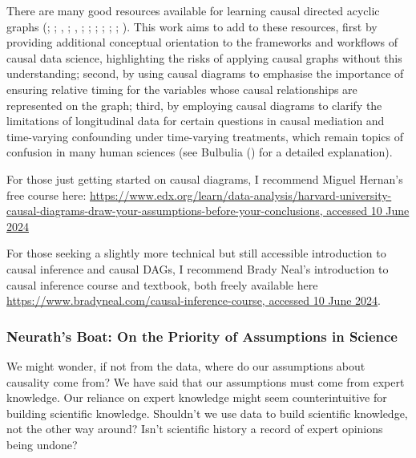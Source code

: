 \documentclass[
  single column]{article}
\begin{document}
There are many good resources available for learning causal directed
acyclic graphs (;
;
,
; , ;
;
;
;
; ; ). This work
aims to add to these resources, first by providing additional conceptual
orientation to the frameworks and workflows of causal data science,
highlighting the risks of applying causal graphs without this
understanding; second, by using causal diagrams to emphasise the
importance of ensuring relative timing for the variables whose causal
relationships are represented on the graph; third, by employing causal
diagrams to clarify the limitations of longitudinal data for certain
questions in causal mediation and time-varying confounding under
time-varying treatments, which remain topics of confusion in many human
sciences (see Bulbulia () for
a detailed explanation).

For those just getting started on causal diagrams, I recommend Miguel
Hernan's free course here:
\href{https://www.edx.org/learn/data-analysis/harvard-university-causal-diagrams-draw-your-assumptions-before-your-conclusions}{https://www.edx.org/learn/data-analysis/harvard-university-causal-diagrams-draw-your-assumptions-before-your-conclusions,
accessed 10 June 2024}

For those seeking a slightly more technical but still accessible
introduction to causal inference and causal DAGs, I recommend Brady
Neal's introduction to causal inference course and textbook, both freely
available here
\href{https://www.bradyneal.com/causal-inference-course}{https://www.bradyneal.com/causal-inference-course,
accessed 10 June 2024}.

\subsubsection{Neurath's Boat: On the Priority of Assumptions in
Science}\label{neuraths-boat-on-the-priority-of-assumptions-in-science}

We might wonder, if not from the data, where do our assumptions about
causality come from? We have said that our assumptions must come from
expert knowledge. Our reliance on expert knowledge might seem
counterintuitive for building scientific knowledge. Shouldn't we use
data to build scientific knowledge, not the other way around? Isn't
scientific history a record of expert opinions being undone?
\end{document}
